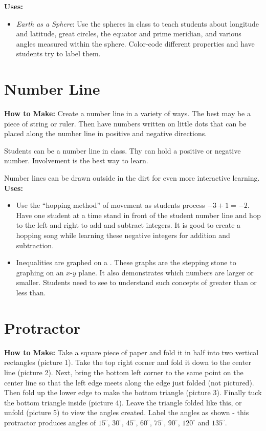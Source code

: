 \noindent\textbf{Uses:}
\begin{itemize}
\item \emph{Earth as a Sphere}: Use the spheres in class to teach students about longitude and latitude, great circles, the equator and prime meridian, and various angles measured within the sphere. Color-code different properties and have students try to label them.
\end{itemize}

\section{Number Line} \label{numberline}
\textbf{How to Make:} Create a number line in a variety of ways. The best may be a piece of string or ruler. Then have numbers written on little dots that can be placed along the number line in positive and negative directions.

Students can be a number line in class. Thy can hold a positive or negative number. Involvement is the best way to learn. 

Number lines can be drawn outside in the dirt for even more interactive learning.\\

\noindent\textbf{Uses:}
\begin{itemize}
\item Use the ``hopping method'' of movement as students process $-3 + 1 = -2$. Have one student at a time stand in front of the student number line and hop to the left and right to add and subtract integers. It is good to create a hopping song while learning these negative integers for addition and subtraction. 
\item Inequalities are graphed on a . These graphs are the stepping stone to graphing on an $x$-$y$ plane. It also demonstrates which numbers are larger or smaller. Students need to see to understand such concepts of greater than or less than.
\end{itemize}

\section{Protractor} \label{protractor}
\textbf{How to Make:} Take a square piece of paper and fold it in half into two vertical rectangles (picture 1). Take the top right corner and fold it down to the center line (picture 2). Next, bring the bottom left corner to the same point on the center line so that the left edge meets along the edge just folded (not pictured). Then fold up the lower edge to make the bottom triangle (picture 3). Finally tuck the bottom triangle inside (picture 4). Leave the triangle folded like this, or unfold (picture 5) to view the angles created. Label the angles as shown - this protractor produces angles of $15^\circ$, $30^\circ$, $45^\circ$, $60^\circ$, $75^\circ$, $90^\circ$, $120^\circ$ and $135^\circ$.

